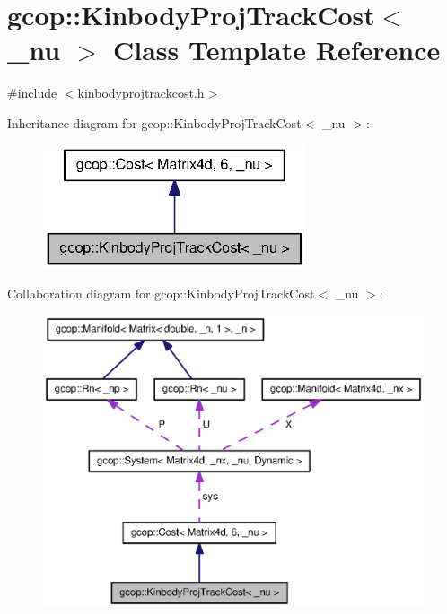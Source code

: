 \section{gcop\-:\-:\-Kinbody\-Proj\-Track\-Cost$<$ \-\_\-nu $>$ \-Class \-Template \-Reference}
\label{classgcop_1_1KinbodyProjTrackCost}


{\ttfamily \#include $<$kinbodyprojtrackcost.\-h$>$}



\-Inheritance diagram for gcop\-:\-:\-Kinbody\-Proj\-Track\-Cost$<$ \-\_\-nu $>$\-:
\nopagebreak
\begin{figure}[H]
\begin{center}
\leavevmode
\includegraphics[width=220pt]{classgcop_1_1KinbodyProjTrackCost__inherit__graph}
\end{center}
\end{figure}


\-Collaboration diagram for gcop\-:\-:\-Kinbody\-Proj\-Track\-Cost$<$ \-\_\-nu $>$\-:
\nopagebreak
\begin{figure}[H]
\begin{center}
\leavevmode
\includegraphics[width=350pt]{classgcop_1_1KinbodyProjTrackCost__coll__graph}
\end{center}
\end{figure}
